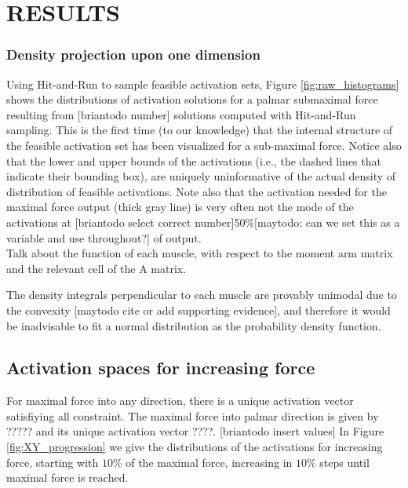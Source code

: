 

\section{RESULTS}
\subsubsection{Density projection upon one dimension} %
\label{ssub:density_projection_upon_one_dimension}

Using Hit-and-Run to sample feasible activation sets, Figure \ref{fig:raw_histograms} shows the distributions of activation solutions for a palmar submaximal force resulting from [briantodo number] solutions computed with Hit-and-Run sampling. This is the first time (to our knowledge) that the internal structure of the feasible activation set has been visualized for a sub-maximal force.
Notice also that the lower and upper bounds of the activations (i.e., the dashed lines that indicate their bounding box), are uniquely uninformative of the actual density of distribution of feasible activations. Note also that the activation needed for the maximal force output (thick gray line) is very often not the mode of the activations at [briantodo select correct number]50\%[maytodo: can we set this as a variable and use throughout?] of output.
\\

Talk about the function of each muscle, with respect to the moment arm matrix and the relevant cell of the A matrix.

The density integrals perpendicular to each muscle are provably unimodal due to the convexity [maytodo cite or add supporting evidence], and therefore it would be inadvisable to fit a normal distribution as the probability density function.

\subsection{Activation spaces for increasing force} %
\label{sub:activation_spaces_for_increasing_force}
For maximal force into any direction, there is a unique activation vector satisfiying all constraint. The maximal force into palmar direction is given by ????? and its unique activation vector ????. [briantodo insert values]
In Figure \ref{fig:XY_progression} we give the distributions of the activations for increasing force, starting with $10\%$ of the maximal force, increasing in $10\%$ steps until maximal force is reached.

